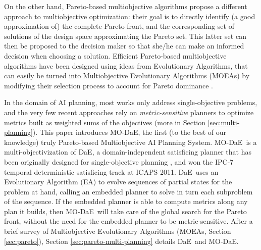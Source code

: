 \documentclass{article}
\def\DAE{{\sc DaE}}
\def\YAHSP{{\sc YAHSP}}
\def\MODAE{{\sc MO-DaE}}
\begin{document}
On the other hand, Pareto-based multiobjective algorithms propose a different approach to multiobjective optimization: their goal is to directly identify (a good approximation of) the complete Pareto front, and the corresponding set of solutions of the design space approximating the Pareto set. This latter set can then be proposed to the decision maker so that she/he can make an informed decision when choosing a solution. 
Efficient Pareto-based multiobjective algorithms have been designed using ideas from Evolutionary Algorithms, that can easily be turned into Multiobjective Evolutionary Algorithms (MOEAs) by modifying their selection process to account for Pareto dominance \cite{Deb-book}.

In the domain of AI planning, most works only address single-objective problems, and the very few recent approaches rely on {\em metric-sensitive} planners to optimize metrics built as weighted sums of the objectives (more in Section \ref{sec:multi-planning}). 
This paper introduces \MODAE, the first (to the best of our knowledge) truly Pareto-based Multiobjective AI Planning System. \MODAE\ is a multi-objectivization of \DAE, a domain-independent satisficing planner that has been originally designed for single-objective planning \cite{evoCOP2006,Bibai2010}, and won the IPC-7 temporal deterministic satisficing track at ICAPS 2011. \DAE\ uses an Evolutionary Algorithm (EA) to evolve sequences of partial states for the problem at hand, calling an embedded planner to solve in turn each subproblem of the sequence. If the embedded planner is able to compute metrics along any plan it builds, then \MODAE\ will take care of the global search for the Pareto front, without the need for the embedded planner to be metric-sensitive. After a brief survey of Multiobjective Evolutionary Algorithms (MOEAs, Section \ref{sec:pareto}), Section \ref{sec:pareto-multi-planning} details \DAE\ and \MODAE.

\end{document}
